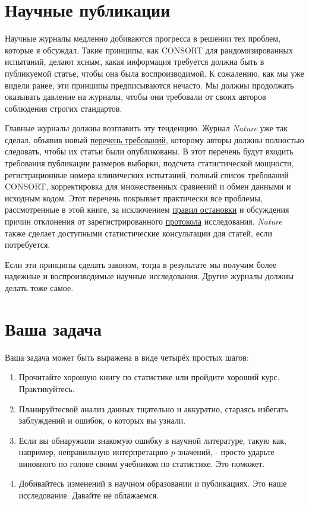 \section{Научные публикации}
\label{chp12:sciencepublishing}

Научные журналы медленно добиваются прогресса в решении тех проблем, которые я обсуждал. Такие принципы, как CONSORT для рандомизированных испытаний, делают ясным, какая информация требуется должна быть в публикуемой статье, чтобы она была воспроизводимой. К сожалению, как мы уже видели ранее, эти принципы предписываются нечасто. Мы должны продолжать оказывать давление на журналы, чтобы они требовали от своих авторов соблюдения строгих стандартов.

Главные журналы должны возглавить эту тенденцию. Журнал \emph{Nature} уже так сделал, объявив новый \href{http://www.nature.com/authors/policies/checklist.pdf}{перечень требований}, которому авторы должны полностью следовать, чтобы их статьи были опубликованы. В этот перечень будут входить требования публикации размеров выборки, подсчета статистической мощности, регистрационные номера клинических испытаний, полный список требований CONSORT, корректировка для множественных сравнений и обмен данными и исходным кодом. Этот перечень покрывает практически все проблемы, рассмотренные в этой книге, за исключением \hyperref[chp7]{правил остановки} и обсуждения причин отклонения от зарегистрированного \hyperref[chp8]{протокола} исследования. \emph{Nature} также сделает доступными статистические консультации для статей, если потребуется. 

Если эти принципы сделать законом, тогда в результате мы получим более надежные и воспроизводимые научные исследования. Другие журналы должны делать тоже самое.


\section{Ваша задача}
\label{chp12:yourjob}

Ваша задача может быть выражена в виде четырёх простых шагов:

\begin{enumerate}

	\item Прочитайте хорошую книгу по статистике или пройдите хороший курс. Практикуйтесь.
	\item Планируйтесвой анализ данных тщательно и аккуратно, стараясь избегать заблуждений и ошибок, о которых вы узнали.
	\item Если вы обнаружили знакомую ошибку в научной литературе, такую как, например, неправильную интерпретацию \emph{p-}значений, - просто ударьте виновного по голове своим учебником по статистике. Это поможет. %
	\item Добивайтесь изменений в научном образовании и публикациях. Это наше исследование. Давайте не облажаемся.

\end{enumerate}


